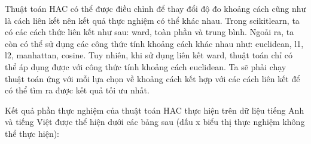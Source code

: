 Thuật toán HAC có thể được điều chỉnh để thay đổi độ đo khoảng cách cũng như là cách liên kết nên kết quả thực nghiệm có thể 
khác nhau.
Trong scikitlearn, ta có các cách thức liên kết như sau: ward, toàn phần và trung bình.
Ngoải ra, ta còn có thể sử dụng các công thức tính khoảng cách khác nhau như: euclidean, l1, l2, manhattan, cosine.
Tuy nhiên, khi sử dụng liên kết ward, thuật toán chỉ có thể áp dụng được với công thức tính khoảng cách euclidean.
Ta sẽ phải chạy thuật toán ứng với mỗi lựa chọn về khoảng cách kết hợp với các cách liên kết để có thể tìm ra được kết quả tối ưu nhất.

Kết quả phần thực nghiệm của thuật toán HAC thực hiện trên dữ liệu tiếng Anh và tiếng Việt được thể hiện dưới các bảng sau (dấu x biểu thị thực nghiệm không thể thực hiện):
%

